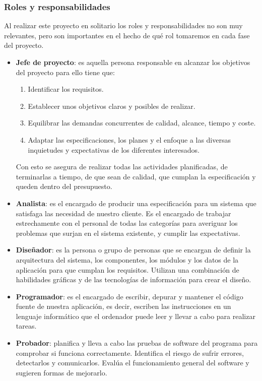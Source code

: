 \documentclass[a4paper,11pt, twoside]{article}
\begin{document}
\subsubsection{Roles y responsabilidades}
Al realizar este proyecto en solitario los roles y responsabilidades no son muy relevantes, pero son importantes en el hecho de qué rol tomaremos en cada fase del proyecto.
\begin{itemize}
\item \textbf{Jefe de proyecto}: es aquella persona responsable en alcanzar los objetivos del proyecto para ello tiene que: 
\begin{enumerate}
\item Identificar los requisitos.
\item Establecer unos objetivos claros y posibles de realizar.
\item Equilibrar las demandas concurrentes de calidad, alcance, tiempo y coste.
\item Adaptar las especificaciones, los planes y el enfoque a las diversas inquietudes y expectativas de los diferentes interesados.
\end{enumerate}
Con esto se asegura de realizar todas las actividades planificadas, de terminarlas a tiempo, de que sean de calidad, que cumplan la especificación y queden dentro del presupuesto.
\item \textbf{Analista}: es el encargado de producir una especificación para un sistema que satisfaga las necesidad de nuestro cliente. Es el encargado de trabajar estrechamente con el personal de todas las categorías para averiguar los problemas que surjan en el sistema existente, y cumplir las expectativas.
\item \textbf{Diseñador}: es la persona o grupo de personas que se encargan de definir la arquitectura del sistema, los componentes, los módulos y los datos de la aplicación para que cumplan los requisitos. Utilizan una combinación de habilidades gráficas y de las tecnologías de información para crear el diseño.
\item \textbf{Programador}: es el encargado de escribir, depurar y mantener el código fuente de nuestra aplicación, es decir, escriben las instrucciones en un lenguaje informático que el ordenador puede leer y llevar a cabo para realizar tareas.
\item \textbf{Probador}: planifica y lleva a cabo las pruebas de software del programa para comprobar si funciona correctamente. Identifica el riesgo de sufrir errores, detectarlos y comunicarlos. Evalúa el funcionamiento general del software y sugieren formas de mejorarlo.
\end{itemize}
\end{document}
